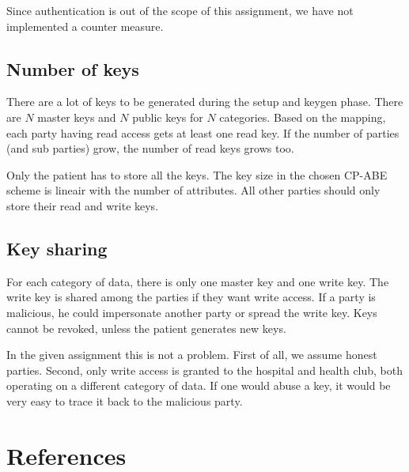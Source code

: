 \documentclass[a4paper]{article}
\begin{document}
		Since authentication is out of the scope of this assignment, we have not implemented a counter measure.
		
	\subsection{Number of keys}
		There are a lot of keys to be generated during the setup and keygen phase. There are $N$ master keys and $N$ public keys for $N$ categories. Based on the mapping, each party having read access gets at least one read key. If the number of parties (and sub parties) grow, the number of read keys grows too.
		
		Only the patient has to store all the keys. The key size in the chosen CP-ABE scheme is lineair with the number of attributes. All other parties should only store their read and write keys.
	
	\subsection{Key sharing}
		For each category of data, there is only one master key and one write key. The write key is shared among the parties if they want write access. If a party is malicious, he could impersonate another party or spread the write key. Keys cannot be revoked, unless the patient generates new keys.
		
		In the given assignment this is not a problem. First of all, we assume honest parties. Second, only write access is granted to the hospital and health club, both operating on a different category of data. If one would abuse a key, it would be very easy to trace it back to the malicious party.

\section{References}
	
	
\end{document}
